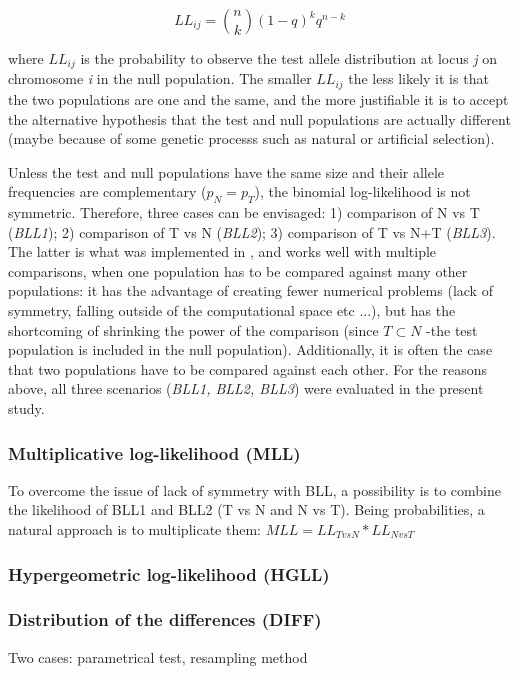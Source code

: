\documentclass{bmcart}
\begin{document}
\begin{equation}
LL_{ij}={n \choose k} (1-q)^kq^{n-k}
\end{equation}

where $LL_{ij}$ is the probability to observe the test allele
distribution at locus \emph{j} on chromosome \emph{i} in the null population. 
The smaller $LL_{ij}$ the less likely it is that the two populations are
one and the same, and the more justifiable it is to accept the
alternative hypothesis that the test and null populations are actually
different (maybe because of some genetic processs such as natural or
artificial selection). 

Unless the test and null populations have the same size and their allele
frequencies are complementary ($p_N=p_T$), the binomial log-likelihood
is not symmetric. Therefore, three cases can be envisaged: 1) comparison
of N vs T (\emph{BLL1}); 2) comparison of T vs N (\emph{BLL2}); 3)
  comparison of  T vs N+T (\emph{BLL3}). The latter is what was
  implemented in \cite{stella2010identification}, and works well with
  multiple comparisons, when one population has to be compared against
  many other populations: it has the advantage
  of creating fewer numerical problems (lack of symmetry, falling
  outside of the computational space etc ...), but has the shortcoming
  of shrinking the power of the comparison (since $T \subset N$ -the test population is
  included in the null population). Additionally, it is often the case
  that two populations have to be compared against each other. For the
  reasons above, all three scenarios (\emph{BLL1, BLL2, BLL3}) were
  evaluated in the present study.

\subsubsection*{Multiplicative log-likelihood (MLL)}
To overcome the issue of lack of symmetry with BLL, a
possibility is to combine the likelihood of BLL1 and BLL2 (T vs N
and N vs T). Being probabilities, a natural approach is to multiplicate
them: $MLL = LL_{TvsN}*LL_{NvsT}$ 


\subsubsection*{Hypergeometric log-likelihood (HGLL)}
\subsubsection*{Distribution of the differences (DIFF)}
Two cases: parametrical test, resampling method
\end{document}
